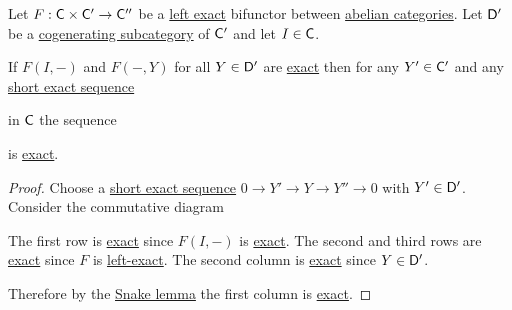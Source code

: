 \documentclass[../../main]{subfiles}
\begin{document}
\begin{lemma}\label{lemma:bifunctor-and-cogenerating-sequences}
  Let \(F: \mathsf{C} \times \mathsf{C'} \to \mathsf{C''}\) be a \hyperref[def:exact-functor]{left exact} bifunctor between \hyperref[def:abelian-category]{abelian categories}.
  Let \(\mathsf{D'}\) be a \hyperref[def:cogenerating-category]{cogenerating subcategory} of \(\mathsf{C'}\) and let \(I \in \mathsf{C}\).

  If \(F(I, -)\) and \(F(-, Y)\) for all \(Y \in \mathsf{D'}\) are \hyperref[def:exact-functor]{exact} then for any \(Y' \in \mathsf{C'}\) and any \hyperref[def:exact-sequence]{short exact sequence}
  \begin{center}
  \end{center}
  in \(\mathsf{C}\) the sequence
  \begin{center}
  \end{center}
  is \hyperref[def:exact-sequence]{exact}.
\end{lemma}
\begin{proof}
  Choose a \hyperref[def:exact-sequence]{short exact sequence} \(0 \to Y' \to Y \to Y'' \to 0\) with \(Y' \in \mathsf{D'}\).
  Consider the commutative diagram
  \begin{center}
  \end{center}
  The first row is \hyperref[def:exact-sequence]{exact} since \(F(I, -)\) is \hyperref[def:exact-functor]{exact}.
  The second and third rows are \hyperref[def:exact-sequence]{exact} since \(F\) is \hyperref[def:exact-functor]{left-exact}.
  The second column is \hyperref[def:exact-sequence]{exact} since \(Y \in \mathsf{D'}\).

  Therefore by the \hyperref[lemma:snake-lemma]{Snake lemma} the first column is \hyperref[def:exact-sequence]{exact}.
\end{proof}
\end{document}
